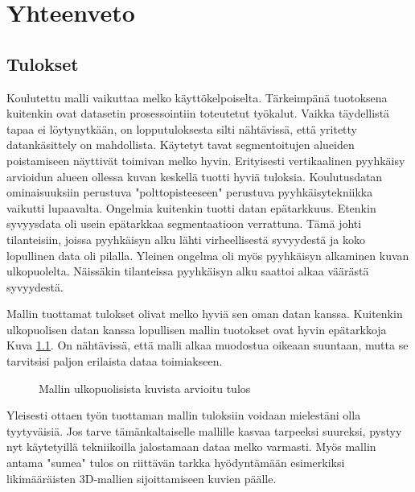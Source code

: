 \chapter{Yhteenveto}%
\label{ch:yhteenveto}

\section{Tulokset}

Koulutettu malli vaikuttaa melko käyttökelpoiselta. Tärkeimpänä tuotoksena kuitenkin ovat datasetin prosessointiin toteutetut työkalut.
Vaikka täydellistä tapaa ei löytynytkään, on lopputuloksesta silti nähtävissä, että yritetty datankäsittely on mahdollista.
Käytetyt tavat segmentoitujen alueiden poistamiseen näyttivät toimivan melko hyvin.
Erityisesti vertikaalinen pyyhkäisy arvioidun alueen ollessa kuvan keskellä tuotti hyviä tuloksia.
Koulutusdatan ominaisuuksiin perustuva "polttopisteeseen" perustuva pyyhkäisytekniikka vaikutti lupaavalta.
Ongelmia kuitenkin tuotti datan epätarkkuus.
Etenkin syvyysdata oli usein epätarkkaa segmentaatioon verrattuna.
Tämä johti tilanteisiin, joissa pyyhkäisyn alku lähti virheellisestä syvyydestä ja koko lopullinen data oli pilalla. 
Yleinen ongelma oli myös pyyhkäisyn alkaminen kuvan ulkopuolelta.
Näissäkin tilanteissa pyyhkäisyn alku saattoi alkaa väärästä syvyydestä.

Mallin tuottamat tulokset olivat melko hyviä sen oman datan kanssa.
Kuitenkin ulkopuolisen datan kanssa lopullisen mallin tuotokset ovat hyvin epätarkkoja Kuva \ref{fig:ulkoinen}.
On nähtävissä, että malli alkaa muodostua oikeaan suuntaan, mutta se tarvitsisi paljon erilaista dataa toimiakseen.

\begin{figure}[h]
\centering
{}
\caption{Mallin ulkopuolisista kuvista arvioitu tulos}
\label{fig:ulkoinen}
\end{figure}

Yleisesti ottaen työn tuottaman mallin tuloksiin voidaan mielestäni olla tyytyväisiä.
Jos tarve tämänkaltaiselle mallille kasvaa tarpeeksi suureksi, pystyy nyt käytetyillä tekniikoilla jalostamaan dataa melko varmasti.
Myös mallin antama "sumea" tulos on riittävän tarkka hyödyntämään esimerkiksi likimääräisten 3D-mallien sijoittamiseen kuvien päälle.

